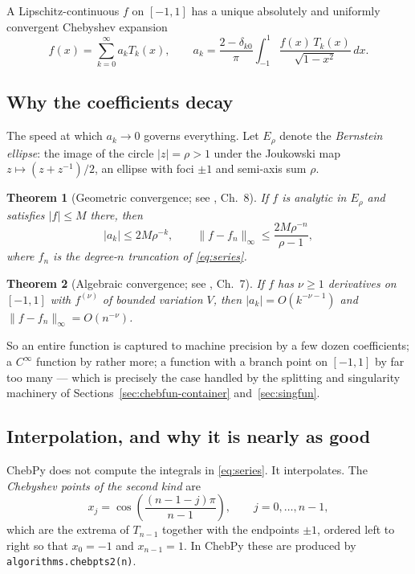 \documentclass[11pt,a4paper]{article}
\newtheorem{theorem}{Theorem}
\newcommand{\cheb}[1]{T_{#1}}
\newcommand{\code}[1]{\texttt{#1}}
\begin{document}
A Lipschitz-continuous $f$ on $[-1,1]$ has a unique absolutely and uniformly
convergent Chebyshev expansion
\begin{equation}
  f(x) = \sum_{k=0}^{\infty} a_k \cheb{k}(x),
  \qquad
  a_k = \frac{2 - \delta_{k0}}{\pi} \int_{-1}^{1}
        \frac{f(x)\,\cheb{k}(x)}{\sqrt{1 - x^2}} \, dx .
  \label{eq:series}
\end{equation}

\subsection{Why the coefficients decay}

The speed at which $a_k \to 0$ governs everything. Let $E_\rho$ denote the
\emph{Bernstein ellipse}: the image of the circle $|z| = \rho > 1$ under the
Joukowski map $z \mapsto (z + z^{-1})/2$, an ellipse with foci $\pm 1$ and
semi-axis sum $\rho$.

\begin{theorem}[Geometric convergence; see \cite{trefethen2013}, Ch.~8]
\label{thm:analytic}
If $f$ is analytic in $E_\rho$ and satisfies $|f| \le M$ there, then
\[
  |a_k| \le 2M\rho^{-k},
  \qquad
  \bigl\| f - f_n \bigr\|_\infty \le \frac{2M\rho^{-n}}{\rho - 1},
\]
where $f_n$ is the degree-$n$ truncation of \eqref{eq:series}.
\end{theorem}

\begin{theorem}[Algebraic convergence; see \cite{trefethen2013}, Ch.~7]
\label{thm:diff}
If $f$ has $\nu \ge 1$ derivatives on $[-1,1]$ with $f^{(\nu)}$ of bounded
variation $V$, then $|a_k| = O(k^{-\nu-1})$ and
$\|f - f_n\|_\infty = O(n^{-\nu})$.
\end{theorem}

So an entire function is captured to machine precision by a few dozen
coefficients; a $C^\infty$ function by rather more; a function with a branch
point on $[-1,1]$ by far too many --- which is precisely the case handled by
the splitting and singularity machinery of Sections~\ref{sec:chebfun-container}
and~\ref{sec:singfun}.

\subsection{Interpolation, and why it is nearly as good}

ChebPy does not compute the integrals in \eqref{eq:series}. It interpolates.
The \emph{Chebyshev points of the second kind} are
\begin{equation}
  x_j = \cos\!\left(\frac{(n-1-j)\pi}{n-1}\right), \qquad j = 0, \ldots, n-1,
  \label{eq:chebpts}
\end{equation}
which are the extrema of $\cheb{n-1}$ together with the endpoints $\pm 1$,
ordered left to right so that $x_0 = -1$ and $x_{n-1} = 1$. In ChebPy these are
produced by \code{algorithms.chebpts2(n)}.
\end{document}
